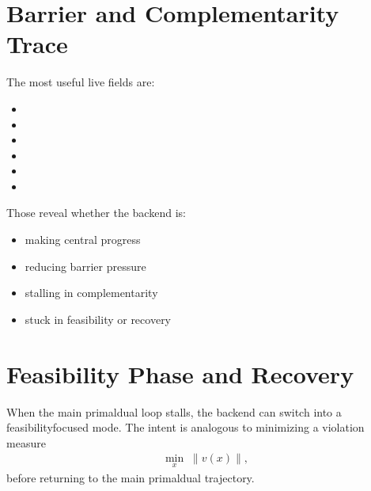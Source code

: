 \documentclass[letterpaper,10pt,english]{sphinxmanual}
\begin{document}
\section{Barrier and Complementarity Trace}
\label{\detokenize{optima_internal_protocol:barrier-and-complementarity-trace}}
\sphinxAtStartPar
The most useful live fields are:
\begin{itemize}
\item {} 
\sphinxAtStartPar
{}

\item {} 
\sphinxAtStartPar
{}

\item {} 
\sphinxAtStartPar
{}

\item {} 
\sphinxAtStartPar
{}

\item {} 
\sphinxAtStartPar
{}

\item {} 
\sphinxAtStartPar
{}

\end{itemize}

\sphinxAtStartPar
Those reveal whether the backend is:
\begin{itemize}
\item {} 
\sphinxAtStartPar
making central progress

\item {} 
\sphinxAtStartPar
reducing barrier pressure

\item {} 
\sphinxAtStartPar
stalling in complementarity

\item {} 
\sphinxAtStartPar
stuck in feasibility or recovery

\end{itemize}


\section{Feasibility Phase and Recovery}
\label{\detokenize{optima_internal_protocol:feasibility-phase-and-recovery}}
\sphinxAtStartPar
When the main primal\sphinxhyphen{}dual loop stalls, the backend can switch into a feasibility\sphinxhyphen{}focused mode. The intent is analogous to minimizing a violation measure
\begin{equation*}
\begin{split}\min_x \; \|v(x)\|,\end{split}
\end{equation*}
\sphinxAtStartPar
before returning to the main primal\sphinxhyphen{}dual trajectory.
\end{document}
